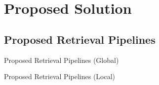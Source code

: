 \documentclass[mathserif]{beamer}
\begin{document}
\section{Proposed Solution}
\subsection{Proposed Retrieval Pipelines}
\begin{frame}{Proposed Retrieval Pipelines (Global)}
    \begin{figure}
        
    \end{figure}
\end{frame}

\begin{frame}{Proposed Retrieval Pipelines (Local)}
    \begin{figure}
        
    \end{figure}
\end{frame}
\end{document}
